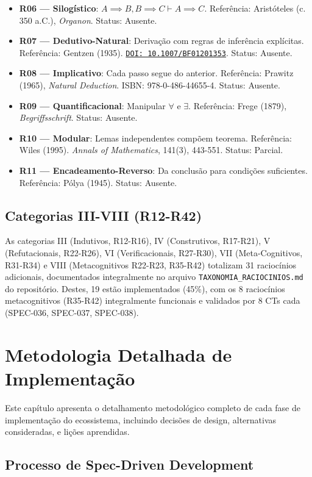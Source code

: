 \documentclass[12pt,a4paper,oneside]{abntex2}
\newcommand{\doi}[1]{\href{https://doi.org/#1}{\texttt{DOI: #1}}}
\begin{document}
\begin{apendicesenv}
\begin{itemize}
    \item \textbf{R06 — Silogístico}: $A \implies B, B \implies C \vdash A \implies C$. Referência: Aristóteles (c. 350 a.C.), \textit{Organon}. Status: Ausente.
    \item \textbf{R07 — Dedutivo-Natural}: Derivação com regras de inferência explícitas. Referência: Gentzen (1935). \doi{10.1007/BF01201353}. Status: Ausente.
    \item \textbf{R08 — Implicativo}: Cada passo segue do anterior. Referência: Prawitz (1965), \textit{Natural Deduction}. ISBN: 978-0-486-44655-4. Status: Ausente.
    \item \textbf{R09 — Quantificacional}: Manipular $\forall$ e $\exists$. Referência: Frege (1879), \textit{Begriffsschrift}. Status: Ausente.
    \item \textbf{R10 — Modular}: Lemas independentes compõem teorema. Referência: Wiles (1995). \textit{Annals of Mathematics}, 141(3), 443-551. Status: Parcial.
    \item \textbf{R11 — Encadeamento-Reverso}: Da conclusão para condições suficientes. Referência: Pólya (1945). Status: Ausente.
\end{itemize}

\section{Categorias III-VIII (R12-R42)}

As categorias III (Indutivos, R12-R16), IV (Construtivos, R17-R21), V (Refutacionais, R22-R26), VI (Verificacionais, R27-R30), VII (Meta-Cognitivos, R31-R34) e VIII (Metacognitivos R22-R23, R35-R42) totalizam 31 raciocínios adicionais, documentados integralmente no arquivo \texttt{TAXONOMIA\_RACIOCINIOS.md} do repositório. Destes, 19 estão implementados (45\%), com os 8 raciocínios metacognitivos (R35-R42) integralmente funcionais e validados por 8 CTs cada (SPEC-036, SPEC-037, SPEC-038).


\chapter{Metodologia Detalhada de Implementação}

Este capítulo apresenta o detalhamento metodológico completo de cada fase de implementação do ecossistema, incluindo decisões de design, alternativas consideradas, e lições aprendidas.

\section{Processo de Spec-Driven Development}


\end{apendicesenv}
\end{document}

